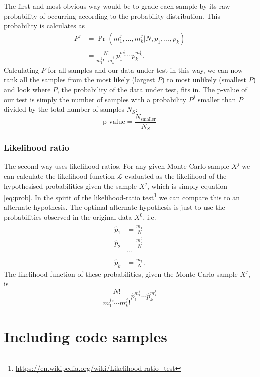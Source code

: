 \documentclass{ol-softwaremanual}
\newcommand{\doclink}[2]{\href{#1}{#2}\footnote{\url{#1}}}
\begin{document}
The first and most obvious way would be to grade each sample by its raw 
probability of occurring according to the probability distribution. This 
probability is calculates as
\begin{align}
P^j &= \Pr\left(m^j_1, \ldots, m^j_k | N , p_1, \ldots, p_k\right) \nonumber \\ 
\label{eq:prob}
&= \frac{N!}{m^j_1! \cdots m^j_k!} p_1^{m^j_1} \cdots p_k^{m^j_k}.
\end{align}
Calculating $P$ for all samples and our data under test in this way, we can 
now rank all the samples from the most likely (largest $P$) to most unlikely 
(smallest $P$) and look where $P$, the probability of the data under test, fits 
in. 
The p-value of our test is simply the number of samples with a probability 
$P^j$ smaller than $P$ divided by the total number of samples $N_S$:
\begin{equation}
\textrm{p-value} = \frac{N_{\textrm{smaller}}}{N_S}
\end{equation}


\subsubsection{Likelihood ratio}

The second way uses likelihood-ratios. For any given Monte Carlo sample $X^j$ 
we can calculate the likelihood-function $\mathcal{L}$ evaluated as the 
likelihood of the hypothesised probabilities given the sample $X^j$, which is 
simply equation \eqref{eq:prob}. In the spirit of the 
\doclink{https://en.wikipedia.org/wiki/Likelihood-ratio_test}{likelihood-ratio 
test} we can compare this to an alternate hypothesis. The optimal alternate 
hypothesis is just to use the probabilities observed in the original data 
$X^0$, i.e.
\begin{align*}
\hat{p}_1 &= \frac{m^0_1}{N} \\
\hat{p}_2 &= \frac{m^0_2}{N} \\
& \cdots \\
\hat{p}_k &= \frac{m^0_k}{N}.
\end{align*}
The likelihood function of these probabilities, given the Monte Carlo sample 
$X^j$, is
\begin{equation}
\frac{N!}{m^j_1! \cdots m^j_k!} \hat{p}_1^{m^j_1} \cdots \hat{p}_k^{m^j_k}
\end{equation}


\section{Including code samples}


\end{document}
